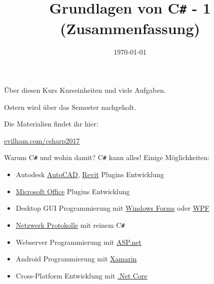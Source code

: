 



\title{Grundlagen von C\texttt{\#} - 1 (Zusammenfassung)}
\date{\today}

\usepackage{subfig}


\maketitle

\begin{frame}{Über diesen Kurs}
	 Kurseinheiten und viele Aufgaben.
	
	Ostern wird über das Semester nachgeholt.
	
	\vspace{0.7cm}
	\centering Die Materialien findet ihr hier:
	
	\huge \href{https://evilham.com/csharp2017}{evilham.com/csharp2017}

\end{frame}

\begin{frame}{Warum C\texttt{\#} und wohin damit?}
C\texttt{\#} kann alles! Einige Möglichkeiten:
\begin{itemize}
\item Autodesk \href{https://en.wikipedia.org/wiki/AutoCAD}{AutoCAD}, \href{https://en.wikipedia.org/wiki/Revit}{Revit} Plugins Entwicklung
\item \href{https://dev.office.com/}{Microsoft Office} Plugins Entwicklung
\item Desktop GUI Programmierung mit \href{https://en.wikipedia.org/wiki/Windows_Forms}{Windows Forms} oder \href{http://www.wpf-tutorial.com/about-wpf/what-is-wpf/}{WPF}
\item \href{https://en.wikipedia.org/wiki/Network_socket}{Netzwerk Protokolle} mit reinem C\texttt{\#}
\item Webserver Programmierung mit \href{https://www.asp.net/}{ASP.net}
\item Android Programmierung mit \href{https://en.wikipedia.org/wiki/Xamarin}{Xamarin}
\item Cross-Platform Entwicklung mit \href{https://dot.net}{.Net Core}
\end{itemize}
\end{frame}

